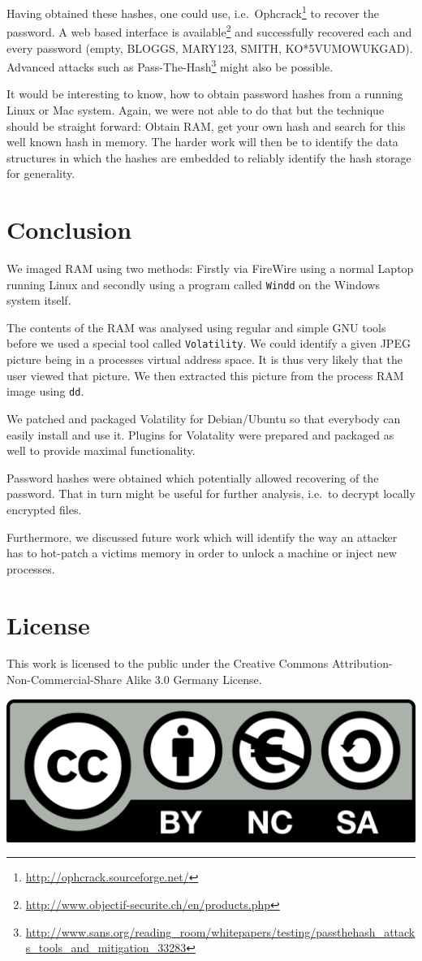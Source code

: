 \documentclass[a4paper,
    11pt,
    normalheadings,
    parindent,
    UKenglish,
    abstracton,
    ]{scrartcl}
\newcommand{\FIXME}[1]{\mbox{}\marginpar{\footnotesize\raggedright\hspace{0pt}\color{red}\emph{#1}}}
\begin{document}
Having obtained these hashes, one could use, i.e.\, Ophcrack\footnote{\url{http://ophcrack.sourceforge.net/}} to recover the password.
A web based interface is available\footnote{\url{http://www.objectif-securite.ch/en/products.php}} and successfully recovered each and every password (empty, BLOGGS, MARY123, SMITH, KO*5VUMOWUKGAD).
Advanced attacks such as Pass-The-Hash\footnote{\url{http://www.sans.org/reading_room/whitepapers/testing/passthehash_attacks_tools_and_mitigation_33283}} might also be possible.

It would be interesting to know, how to obtain password hashes from a running Linux or Mac system.
Again, we were not able to do that but the technique should be straight forward: Obtain RAM, get your own hash and search for this well known hash in memory.
The harder work will then be to identify the data structures in which the hashes are embedded to reliably identify the hash storage for generality.






\section{Conclusion}


We imaged RAM using two methods: Firstly via FireWire using a normal Laptop running Linux and secondly using a program called \texttt{Windd} on the Windows system itself.


The contents of the RAM was analysed using regular and simple GNU tools before we used a special tool called \texttt{Volatility}.
We could identify a given JPEG picture being in a processes virtual address space.
It is thus very likely that the user viewed that picture. We then extracted this picture from the process RAM image using \texttt{dd}.

We patched and packaged Volatility for Debian/Ubuntu so that everybody can easily install and use it.
Plugins for Volatality were prepared and packaged as well to provide maximal functionality.

Password hashes were obtained which potentially allowed recovering of the password.
That in turn might be useful for further analysis, i.e.\, to decrypt locally encrypted files.

Furthermore, we discussed future work which will identify the way an attacker has to hot-patch a victims memory in order to unlock a machine or inject new processes.


\section*{License}
This work is licensed to the public under the Creative Commons Attribution-Non-Commercial-Share Alike 3.0 Germany License.
\begin{center}\includegraphics{bin/by-nc-sa-eu.png}\end{center}
\end{document}
